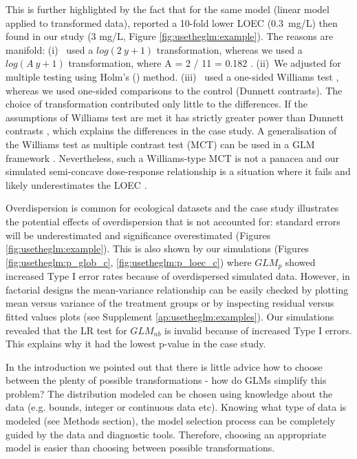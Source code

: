 This is further highlighted by the fact that for the same model (linear model applied to transformed data), \citet{brock_minimum_2015} reported a 10-fold lower LOEC (\mbox{0.3 mg/L}) then found in our study (3 mg/L, Figure \ref{fig:usetheglm:example}).
The reasons are manifold: 
(i)~\citet{brock_minimum_2015} used a $log(2~y + 1)$ transformation, whereas we used a $log(A~y + 1)$ transformation, where A = 2 / 11 = 0.182 \citep{van_den_brink_impact_2000}.
(ii)~We adjusted for multiple testing using Holm's (\citeyear{holm_simple_1979}) method.
(iii)~\citet{brock_minimum_2015} used a one-sided Williams test \citep{williams_comparison_1972}, whereas we used one-sided comparisons to the control (Dunnett contrasts).
The choice of transformation contributed only little to the differences. 
If the assumptions of Williams test  are met it has strictly greater power than Dunnett contrasts \citep{jaki_statistical_2013}, which explains the differences in the case study.
A generalisation of the Williams test as multiple contrast test (MCT) can be used in a GLM framework \citep{hothorn_simultaneous_2008}.
Nevertheless, such a Williams-type MCT is not a panacea \citep{hothorn_statistical_2014} and our simulated semi-concave dose-response relationship is a situation where it fails and likely underestimates the LOEC \citep{kuiper_identification_2014}. 
 

Overdispersion is common for ecological datasets \citep{warton_many_2005} and the case study illustrates the potential effects of overdispersion that is not accounted for: standard errors will be underestimated and significance overestimated (Figures \ref{fig:usetheglm:example}).
This is also shown by our simulations (Figures \ref{fig:usetheglm:p_glob_c}, \ref{fig:usetheglm:p_loec_c}) where $GLM_p$ showed increased Type I error rates because of overdispersed simulated data. 
However, in factorial designs the mean-variance relationship can be easily \linebreak checked by plotting mean versus variance of the treatment groups or by inspecting residual versus fitted values plots (see Supplement \ref{ap:usetheglm:examples}).
Our simulations revealed that the LR test for $GLM_{nb}$ is invalid because of increased Type I errors. This explains why it had the lowest p-value in the case study.

In the introduction we pointed out that there is little advice how to choose between the plenty of possible transformations - how do GLMs simplify this problem?
The distribution modeled can be chosen using knowledge about the data (e.g. bounds, integer or continuous data etc).
Knowing what type of data is modeled (see Methods section), the model selection process can be completely guided by the data and diagnostic tools. Therefore, choosing an appropriate model is easier than choosing between possible transformations.


